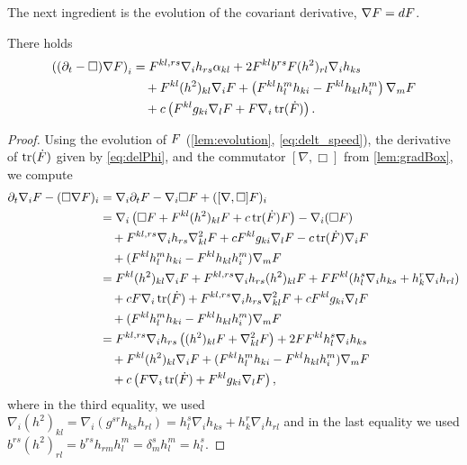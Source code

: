 \documentclass{amsart}
\begin{document}
The next ingredient is the evolution of the covariant derivative, \(\nabla F = dF\).
\begin{lemma}
\label{lem:Evgradphi}
There holds
\[
\begin{split}
\left((\partial_{t}-\Box)\nabla F\right)_{i} &= F^{kl,rs}\nabla_i h_{rs} \alpha_{kl} + 2 F^{kl} b^{rs} F(h^2)_{rl} \nabla_i h_{ks} \\
&\quad + F^{kl}(h^2)_{kl}\nabla_i F + \left(F^{kl}h^{m}_{l}h_{ki} - F^{kl}h_{kl}h^{m}_{i}\right) \nabla_m F\\
&\quad + c\left(F^{kl}g_{ki} \nabla_l F + F \nabla_i \operatorname{tr}(\dot{F})\right).
\end{split}
\]
\end{lemma}
\begin{proof}
Using the evolution of \(F\) (\cref{lem:evolution}, \cref{eq:delt_speed}), the derivative of \(\operatorname{tr}(\dot{F})\) given by \eqref{eq:delPhi}, and the commutator \([\nabla, \Box]\) from \cref{lem:gradBox}, we compute
\[
\begin{split}
\partial_{t}\nabla_i F - (\Box\nabla F)_{i} &= \nabla_i \partial_t F - \nabla_i \Box F + ([\nabla, \Box] F)_i \\
&= \nabla_i \left(\Box F + F^{kl}(h^2)_{kl}F + c \operatorname{tr}(\dot{F})F\right) - \nabla_i (\Box F) \\
&\quad + F^{kl,rs} \nabla_i h_{rs} \nabla^2_{kl} F + cF^{kl}g_{ki} \nabla_l F - c\operatorname{tr}(\dot{F})\nabla_i F \\
&\quad + (F^{kl}h^{m}_{l}h_{ki} - F^{kl}h_{kl}h^{m}_{i}) \nabla_m F \\
&= F^{kl}(h^2)_{kl}\nabla_i F + F^{kl,rs}\nabla_i h_{rs} (h^2)_{kl}F + FF^{kl}(h^s_l \nabla_i h_{ks} + h^r_k \nabla_i h_{rl})\\&\quad  + c F\nabla_i\operatorname{tr}(\dot{F})
+ F^{kl,rs} \nabla_i h_{rs} \nabla^2_{kl} F + cF^{kl}g_{ki}\nabla_l F \\
&\quad + (F^{kl}h^{m}_{l}h_{ki} - F^{kl}h_{kl}h^{m}_{i}) \nabla_m F \\
&= F^{kl,rs}\nabla_i h_{rs} \left((h^2)_{kl}F + \nabla^2_{kl} F\right) + 2 FF^{kl} h^s_l \nabla_i h_{ks} \\
&\quad + F^{kl}(h^2)_{kl}\nabla_i F + (F^{kl}h^{m}_{l}h_{ki} - F^{kl}h_{kl}h^{m}_{i}) \nabla_m F \\
&\quad + c \left(F\nabla_i\operatorname{tr}(\dot{F}) + F^{kl}g_{ki}\nabla_l F\right),
\end{split}
\]
where in the third equality, we used
$
\nabla_i (h^2)_{kl} = \nabla_i (g^{sr} h_{ks} h_{rl}) = h^s_l \nabla_i h_{ks} + h^r_k \nabla_i h_{rl}
$
and in the last equality we used
$
b^{rs} (h^2)_{rl} = b^{rs} h_{rm} h^m_l = \delta^s_m h^m_l = h^s_l.
$
\end{proof}
\end{document}
